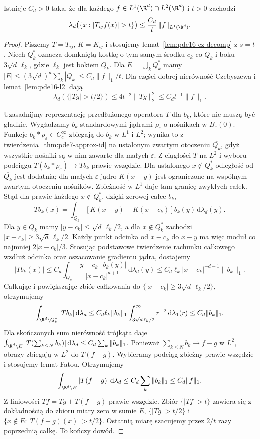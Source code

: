 \begin{twierdzenie}
\label{thm:pde16-weak11}
Istnieje $C_d>0$ taka, że dla każdego
$f\in L^1(\R^d)\cap L^2(\R^d)$ i $t>0$ zachodzi
\begin{equation}\label{eq:pde16-weak11}
 \lambda_d\bigl(\{x:|T_{ij}f(x)|>t\}\bigr)
 \le \frac{C_d}{t}\,\|f\|_{L^1(\R^d)}.
\end{equation}
\end{twierdzenie}
\begin{proof}
Piszemy $T=T_{ij}$, $K=K_{ij}$ i stosujemy
lemat~\ref{lem:pde16-cz-decomp} z $s=t$.
Niech $Q_k^*$ oznacza domkniętą kostkę o tym samym środku
$c_k$ co $Q_k$ i boku $3\sqrt d\,\ell_k$,
gdzie $\ell_k$ jest bokiem $Q_k$. Dla
$E=\bigcup_k Q_k^*$ mamy
$|E|\le(3\sqrt d)^d\sum_k|Q_k|\le C_d\|f\|_1/t$.
Dla części dobrej nierówność Czebyszewa i
lemat~\ref{lem:pde16-l2} dają
\[
 \lambda_d(\{|Tg|>t/2\})
 \le 4t^{-2}\|Tg\|_2^2
 \le C_dt^{-1}\|f\|_1.
\]

Uzasadnijmy reprezentację przedłużonego operatora $T$
dla $b_k$, które nie muszą być gładkie.
Wygładzamy $b_k$ standardowymi jądrami
$\rho_\varepsilon$ o nośnikach w $B_\varepsilon(0)$.
Funkcje $b_k*\rho_\varepsilon\in C_c^\infty$
zbiegają do $b_k$ w $L^1$ i $L^2$; wynika to
z twierdzenia~\ref{thm:pde7-approx-id} na ustalonym
zwartym otoczeniu $\overline{Q_k}$, gdyż wszystkie
nośniki są w nim zawarte dla małych $\varepsilon$.
Z ciągłości $T$ na $L^2$ i wyboru podciągu
$T(b_k*\rho_\varepsilon)\to Tb_k$ prawie wszędzie.
Dla ustalonego $x\notin Q_k^*$ odległość od
$\overline{Q_k}$ jest dodatnia; dla małych
$\varepsilon$ jądro $K(x-y)$ jest ograniczone
na wspólnym zwartym otoczeniu nośników.
Zbieżność w $L^1$ daje tam granicę zwykłych całek.
Stąd dla prawie każdego $x\notin Q_k^*$, dzięki zerowej
całce $b_k$,
\[
 Tb_k(x)=\int_{Q_k}[K(x-y)-K(x-c_k)]
 b_k(y)\,\mathrm d\lambda_d(y).
\]
Dla $y\in Q_k$ mamy $|y-c_k|\le\sqrt d\,\ell_k/2$,
a dla $x\notin Q_k^*$ zachodzi
$|x-c_k|\ge3\sqrt d\,\ell_k/2$.
Każdy punkt odcinka od $x-c_k$ do $x-y$ ma więc
moduł co najmniej $2|x-c_k|/3$. Stosując podstawowe
twierdzenie rachunku całkowego wzdłuż odcinka oraz
oszacowanie gradientu jądra, dostajemy
\[
 |Tb_k(x)|\le C_d\int_{Q_k}
 \frac{|y-c_k|\,|b_k(y)|}{|x-c_k|^{d+1}}
 \,\mathrm d\lambda_d(y)
 \le C_d\ell_k |x-c_k|^{-d-1}\|b_k\|_1.
\]
Całkując i powiększając zbiór całkowania do
$\{|x-c_k|\ge3\sqrt d\,\ell_k/2\}$, otrzymujemy
\[
 \int_{\R^d\setminus Q_k^*}|Tb_k|\,\mathrm d\lambda_d
 \le C_d\ell_k\|b_k\|_1
 \int_{3\sqrt d\,\ell_k/2}^\infty r^{-2}\,\mathrm d\lambda_1(r)
 \le C_d\|b_k\|_1.
\]
Dla skończonych sum nierówność trójkąta daje
$\int_{\R^d\setminus E}|T(\sum_{k\le N}b_k)|
\,\mathrm d\lambda_d\le C_d\sum_k\|b_k\|_1$.
Ponieważ $\sum_{k\le N}b_k\to f-g$ w $L^2$,
obrazy zbiegają w $L^2$ do $T(f-g)$.
Wybieramy podciąg zbieżny prawie wszędzie
i stosujemy lemat Fatou. Otrzymujemy
\[
 \int_{\R^d\setminus E}|T(f-g)|\,\mathrm d\lambda_d
 \le C_d\sum_k\|b_k\|_1\le C_d\|f\|_1.
\]
Z liniowości $Tf=Tg+T(f-g)$ prawie wszędzie.
Zbiór $\{|Tf|>t\}$ zawiera się z dokładnością
do zbioru miary zero w sumie $E$,
$\{|Tg|>t/2\}$ i
$\{x\notin E:|T(f-g)(x)|>t/2\}$.
Ostatnią miarę szacujemy przez $2/t$ razy
poprzednią całkę. To kończy dowód.
\end{proof}

